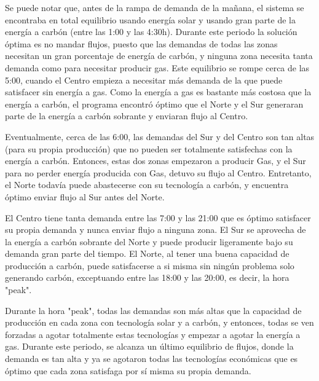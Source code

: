 \documentclass[12pt,twoside]{article}
\begin{document}
	\hspace{1cm} Se puede notar que, antes de la rampa de demanda de la ma\~{n}ana, el sistema se encontraba en total equilibrio usando energ\'ia solar y usando gran parte de la energ\'ia a carb\'on (entre las 1:00 y las 4:30h). Durante este periodo la soluci\'on \'optima es no mandar flujos, puesto que las demandas de todas las zonas necesitan un gran porcentaje de energ\'ia de carb\'on, y ninguna zona necesita tanta demanda como para necesitar producir gas. Este equilibrio se rompe cerca de las 5:00, cuando el Centro empieza a necesitar m\'as demanda de la que puede satisfacer sin energ\'ia a gas. Como la energ\'ia a gas es bastante m\'as costosa que la energ\'ia a carb\'on, el programa encontr\'o \'optimo que el Norte y el Sur generaran parte de la energ\'ia a carb\'on sobrante y enviaran flujo al Centro.
	
	\hspace{1cm} Eventualmente, cerca de las 6:00, las demandas del Sur y del Centro son tan altas (para su propia producci\'on) que no pueden ser totalmente satisfechas con la energ\'ia a carb\'on. Entonces, estas dos zonas empezaron a producir Gas, y el Sur para no perder energ\'ia producida con Gas, detuvo su flujo al Centro. Entretanto, el Norte todav\'ia puede abastecerse con su tecnolog\'ia a carb\'on, y encuentra \'optimo enviar flujo al Sur antes del Norte.
	
	\hspace{1cm} El Centro tiene tanta demanda entre las 7:00 y las 21:00 que es \'optimo satisfacer su propia demanda y nunca enviar flujo a ninguna zona. El Sur se aprovecha de la energ\'ia a carb\'on sobrante del Norte y puede producir ligeramente bajo su demanda gran parte del tiempo. El Norte, al tener una buena capacidad de producci\'on a carb\'on, puede satisfacerse a si misma sin ning\'un problema solo generando carb\'on, exceptuando entre las 18:00 y las 20:00, es decir, la hora "peak".
	
	\hspace{1cm} Durante la hora "peak", todas las demandas son m\'as altas que la capacidad de producci\'on en cada zona con tecnolog\'ia solar y a carb\'on, y entonces, todas se ven forzadas a agotar totalmente estas tecnolog\'ias y empezar a agotar la energ\'ia a gas. Durante este periodo, se alcanza un \'ultimo equilibrio de flujos, donde la demanda es tan alta y ya se agotaron todas las tecnolog\'ias econ\'omicas que es \'optimo que cada zona satisfaga por s\'i misma su propia demanda.
	
\end{document}
